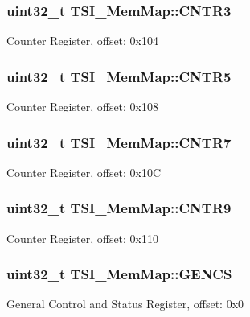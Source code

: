\subsubsection[{C\+N\+T\+R3}]{\setlength{\rightskip}{0pt plus 5cm}uint32\+\_\+t T\+S\+I\+\_\+\+Mem\+Map\+::\+C\+N\+T\+R3}\label{struct_t_s_i___mem_map_a6784d9dce99cc4d0e04e4e527513c525}
Counter Register, offset\+: 0x104 \hypertarget{struct_t_s_i___mem_map_a16e7aed31d05ac2b570308c208471959}{}
\subsubsection[{C\+N\+T\+R5}]{\setlength{\rightskip}{0pt plus 5cm}uint32\+\_\+t T\+S\+I\+\_\+\+Mem\+Map\+::\+C\+N\+T\+R5}\label{struct_t_s_i___mem_map_a16e7aed31d05ac2b570308c208471959}
Counter Register, offset\+: 0x108 \hypertarget{struct_t_s_i___mem_map_a3c2f3ddd1d3725bef9e71fdf30a5ee8a}{}
\subsubsection[{C\+N\+T\+R7}]{\setlength{\rightskip}{0pt plus 5cm}uint32\+\_\+t T\+S\+I\+\_\+\+Mem\+Map\+::\+C\+N\+T\+R7}\label{struct_t_s_i___mem_map_a3c2f3ddd1d3725bef9e71fdf30a5ee8a}
Counter Register, offset\+: 0x10\+C \hypertarget{struct_t_s_i___mem_map_a1792ec66ee609674ea272871f5abcf1c}{}
\subsubsection[{C\+N\+T\+R9}]{\setlength{\rightskip}{0pt plus 5cm}uint32\+\_\+t T\+S\+I\+\_\+\+Mem\+Map\+::\+C\+N\+T\+R9}\label{struct_t_s_i___mem_map_a1792ec66ee609674ea272871f5abcf1c}
Counter Register, offset\+: 0x110 \hypertarget{struct_t_s_i___mem_map_a14380d508e161af3b794962e7c3f8abb}{}
\subsubsection[{G\+E\+N\+C\+S}]{\setlength{\rightskip}{0pt plus 5cm}uint32\+\_\+t T\+S\+I\+\_\+\+Mem\+Map\+::\+G\+E\+N\+C\+S}\label{struct_t_s_i___mem_map_a14380d508e161af3b794962e7c3f8abb}
General Control and Status Register, offset\+: 0x0 \hypertarget{struct_t_s_i___mem_map_a37c8a06461ca09948d6a65a1289bccd9}{}
